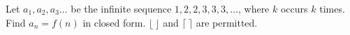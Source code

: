 Let $a_1, a_2, a_3 \ldots$ be the infinite sequence $1, 2, 2, 3, 3, 3, \ldots$, where $k$ occurs $k$ times. Find $a_n = f(n)$ in closed form. $\lfloor\ \rfloor$ and $\lceil\ \rceil$ are permitted.
